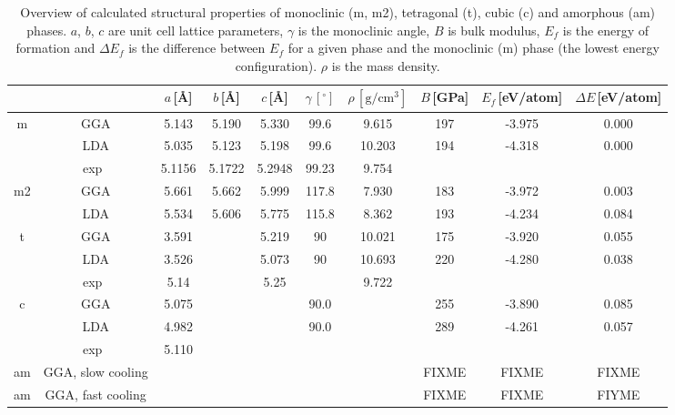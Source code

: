 \documentclass[10pt,a4paper,twocolumn]{article}
\begin{document}
\begin{table}
\begin{center}
\caption{Overview of calculated structural properties of monoclinic (m, m2), tetragonal (t), cubic (c) and amorphous (am) phases. $a$, $b$, $c$ are unit cell lattice parameters, $\gamma$ is the monoclinic angle, $B$ is bulk modulus, $E_f$ is the energy of formation and $\Delta E_f$ is the difference between $E_f$ for a given phase and the monoclinic (m) phase (the lowest energy configuration). $\rho$ is the mass density.}
\label{structure}
\begin{tabular}{cccccccccc}

 & & $a$\,[\AA] & $b$\,[\AA] & $c$\,[\AA] & $\gamma\,[^{\circ}]$ & $\rho\,[\mathrm{g/cm^3}]$ & $B$\,[GPa] & $E_f$\,[eV/atom] & $\Delta E$\,[eV/atom]\\
\hline\hline

m & GGA & 5.143 & 5.190 & 5.330 & 99.6 & 9.615 & 197 & -3.975 & 0.000
\\%
  & LDA & 5.035 & 5.123 & 5.198 & 99.6 & 10.203 & 194 & -4.318 & 0.000
\\%
  & exp~\cite{Adam1959} & 5.1156 & 5.1722 & 5.2948 & 99.23 & 9.754 & & & \\
\hline

m2 & GGA & 5.661 & 5.662 & 5.999 & 117.8 & 7.930 & 183 & -3.972 &
0.003\\ %
   & LDA & 5.534 & 5.606 & 5.775 & 115.8 & 8.362 & 193 & -4.234 &
0.084\\ %
\hline

t & GGA & 3.591 & & 5.219 & 90 & 10.021 & 175 & -3.920 & 0.055\\ %
  & LDA & 3.526 & & 5.073 & 90 & 10.693 & 220 & -4.280 & 0.038\\ %
  & exp~\cite{Curtis1954} & 5.14 & & 5.25 & & 9.722 & & & \\
\hline

c & GGA & 5.075 & & & 90.0 & & 255 & -3.890 & 0.085 \\%
  & LDA & 4.982 & & & 90.0 & & 289 & -4.261 & 0.057 \\%
  & exp~\cite{Senft1983} & 5.110 & & & & & & & \\
\hline


 am & GGA, slow cooling & & & & &  & FIXME & FIXME & FIXME\\ %
 am & GGA, fast cooling & & & & &  & FIXME & FIXME & FIYME\\ %

\end{tabular}
\end{center}
\end{table}
\end{document}
